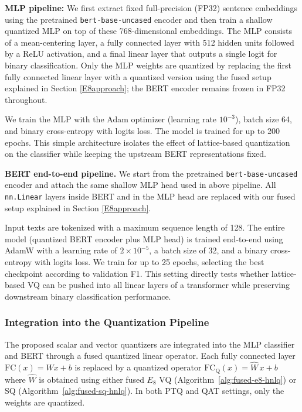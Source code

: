 \documentclass{article}
\theoremstyle{definition}
\theoremstyle{remark}
\begin{document}
\textbf{MLP pipeline:}
\label{mlp_pipeline}
We first extract fixed full-precision (FP32) sentence embeddings using the pretrained \texttt{bert-base-uncased} encoder and then train a shallow quantized MLP on top of these 768-dimensional embeddings. The MLP consists of a mean-centering layer, a fully connected layer with 512 hidden units followed by a ReLU activation, and a final linear layer that outputs a single logit for binary classification. Only the MLP weights are quantized by replacing the first fully connected linear layer with a quantized version using the fused setup explained in Section \ref{E8approach}; the BERT encoder remains frozen in FP32 throughout.

We train the MLP with the Adam optimizer (learning rate $10^{-3}$), batch size 64, and binary cross-entropy with logits loss. The model is trained for up to 200 epochs. This simple architecture isolates the effect of lattice-based quantization on the classifier while keeping the upstream BERT representations fixed.

 \textbf{BERT end-to-end pipeline.}
We start from the pretrained \texttt{bert-base-uncased} encoder and attach the same shallow MLP head used in above pipeline. All \texttt{nn.Linear} layers inside BERT and in the MLP head are replaced with our fused setup explained in Section \ref{E8approach}.

Input texts are tokenized with a maximum sequence length of 128. The entire model (quantized BERT encoder plus MLP head) is trained end-to-end using AdamW with a learning rate of $2\times 10^{-5}$, a batch size of 32, and a binary cross-entropy with logits loss. We train for up to 25 epochs, selecting the best checkpoint according to validation F1. This setting directly tests whether lattice-based VQ can be pushed into all linear layers of a transformer while preserving downstream binary classification performance.

\subsubsection{Integration into the Quantization Pipeline}
\label{sec:qat-integration}
The proposed scalar and vector quantizers are integrated into the MLP classifier and BERT through a fused quantized linear operator. 
Each fully connected layer $\mathrm{FC}(x) = W x + b$
is replaced by a quantized operator $
\mathrm{FC}_{\mathrm{Q}}(x) = \widehat{W}\, x + b
$ where $\widehat{W}$ is obtained using either fused $E_8$ VQ 
(Algorithm~\ref{alg:fused-e8-hnlq}) or SQ
(Algorithm~\ref{alg:fused-sq-hnlq}).  
In both PTQ and QAT settings, only the weights are quantized.
\end{document}
